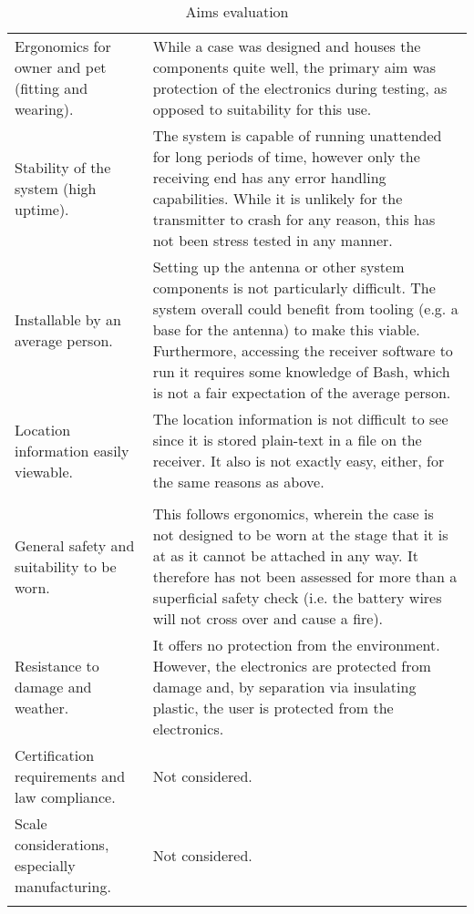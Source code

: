 \documentclass[11pt]{article}
\begin{document}
{\begin{xltabular}{\linewidth}{|>{\raggedright\arraybackslash}p{4cm}|>{\color{white}}Z|}
     \\
    \hline
    Ergonomics for owner and pet (fitting and wearing). & While a case was designed and houses the components 
        quite well, the primary aim was protection of the electronics during testing, as opposed to suitability for this use. \\ \hline
    Stability of the system (high uptime). & The system is capable of running unattended for long periods of 
        time, however only the receiving end has any error handling capabilities. While it is unlikely for the transmitter 
        to crash for any reason, this has not been stress tested in any manner. \\ \hline
    Installable by an average person. & Setting up the antenna or other system components is 
        not particularly difficult. The system overall could benefit from tooling (e.g. a base for the antenna) to 
        make this viable. Furthermore, accessing the receiver software to run it requires some knowledge of Bash, 
        which is not a fair expectation of the average person. \\ \hline
    Location information easily viewable. & The location information is not difficult to see since it is
        stored plain-text in a file on the receiver. It also is not exactly easy, either, for the same reasons as above. \\ \hline
    
     \\
    \hline
    General safety and suitability to be worn. & This follows ergonomics, wherein the case is not designed 
        to be worn at the stage that it is at as it cannot be attached in any way.
        It therefore has not been assessed for more than a superficial safety check (i.e. 
        the battery wires will not cross over and cause a fire). \\ \hline
    Resistance to damage and weather. & It offers no protection from the environment. However, 
        the electronics are protected from damage and, by separation via insulating plastic, the user is protected from the electronics.  \\ \hline
    Certification requirements and law compliance. & Not considered. \\ \hline
    Scale considerations, especially manufacturing. & Not considered. \\ \hline     
    
    \caption{Aims evaluation}
    \label{table:aimeval}

\end{xltabular}
\vspace{-11pt}
}
\end{document}
